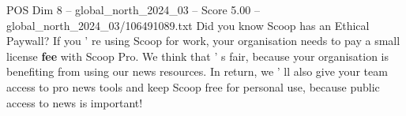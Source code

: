 \begin{textsample}{POS Dim 8 – global\_north\_2024\_03 – Score 5.00 – global\_north\_2024\_03/106491089.txt}
Did you know Scoop has an Ethical Paywall?
If you ' re using Scoop for work, your organisation needs to pay a small license \textbf{fee} with Scoop Pro.
We think that ' s fair, because your organisation is benefiting from using our news resources.
In return, we ' ll also give your team access to pro news tools and keep Scoop free for personal use, because public access to news is important!

\end{textsample}
